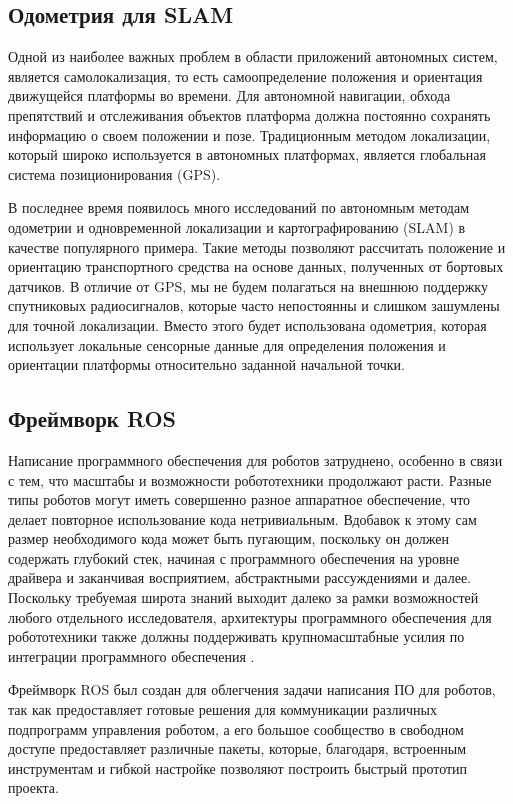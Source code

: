 \documentclass[12pt,a4paper]{scrartcl}
\begin{document}
			\subsection{Одометрия для SLAM}
				Одной из наиболее важных проблем в области приложений автономных систем, является самолокализация, то есть самоопределение положения и ориентация движущейся платформы во времени. Для автономной навигации, обхода препятствий и отслеживания объектов платформа должна постоянно сохранять информацию о своем положении и позе. Традиционным методом локализации, который широко используется в автономных платформах, является глобальная система позиционирования (GPS). 
				
				В последнее время появилось много исследований по автономным методам одометрии и одновременной локализации и картографированию (SLAM) в качестве популярного примера. Такие методы позволяют рассчитать положение и ориентацию транспортного средства на основе данных, полученных от бортовых датчиков. В отличие от GPS, мы не будем полагаться на внешнюю поддержку спутниковых радиосигналов, которые часто непостоянны и слишком зашумлены для точной локализации. Вместо этого будет использована одометрия, которая использует локальные сенсорные данные для определения положения и ориентации платформы относительно заданной начальной точки\cite{bib:OdometrySLAM}.
			\subsection{Фреймворк ROS}
				Написание программного обеспечения для роботов затруднено, особенно в связи с тем, что масштабы и возможности робототехники продолжают расти. Разные типы роботов могут иметь совершенно разное аппаратное обеспечение, что делает повторное использование кода нетривиальным. Вдобавок к этому сам размер необходимого кода может быть пугающим, поскольку он должен содержать глубокий стек, начиная с программного обеспечения на уровне драйвера и заканчивая восприятием, абстрактными рассуждениями и далее. Поскольку требуемая широта знаний выходит далеко за рамки возможностей любого отдельного исследователя, архитектуры программного обеспечения для робототехники также должны поддерживать крупномасштабные усилия по интеграции программного обеспечения \cite{bib:ROSDescription}.
				
				Фреймворк ROS был создан для облегчения задачи написания ПО для роботов, так как предоставляет готовые решения для коммуникации различных подпрограмм управления роботом, а его большое сообщество в свободном доступе предоставляет различные пакеты, которые, благодаря, встроенным инструментам и гибкой настройке позволяют построить быстрый прототип проекта. 
				
\end{document}
